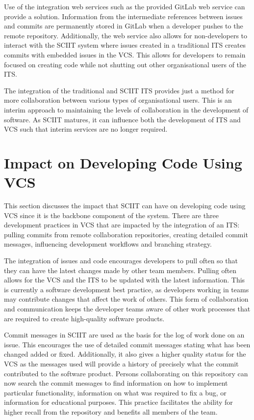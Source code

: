 \documentclass{mproj}
\begin{document}
Use of the integration web services such as the provided GitLab web service can provide a solution. Information from the intermediate references between issues and commits are permanently stored in GitLab when a developer pushes to the remote repository. Additionally, the web service also allows for non-developers to interact with the SCIIT system where issues created in a traditional ITS creates commits with embedded issues in the VCS. This allows for developers to remain focused on creating code while not shutting out other organisational users of the ITS.

The integration of the traditional and SCIIT ITS provides just a method for more collaboration between various types of organisational users. This is an interim approach to maintaining the levels of collaboration in the development of software. As SCIIT matures, it can influence both the development of ITS and VCS such that interim services are no longer required.

\section{Impact on Developing Code Using VCS}

This section discusses the impact that SCIIT can have on developing code using VCS since it is the backbone component of the system. There are three development practices in VCS that are impacted by the integration of an ITS: pulling commits from remote collaboration repositories, creating detailed commit messages, influencing development workflows and branching strategy.

The integration of issues and code encourages developers to pull often so that they can have the latest changes made by other team members. Pulling often allows for the VCS and the ITS to be updated with the latest information. This is currently a software development best practice, as developers working in teams may contribute changes that affect the work of others. This form of collaboration and communication keeps the developer teams aware of other work processes that are required to create high-quality software products.

Commit messages in SCIIT are used as the basis for the log of work done on an issue. This encourages the use of detailed commit messages stating what has been changed added or fixed. Additionally, it also gives a higher quality status for the VCS as the messages used will provide a history of precisely what the commit contributed to the software product. Persons collaborating on this repository can now search the commit messages to find information on how to implement particular functionality, information on what was required to fix a bug, or information for educational purposes. This practice facilitates the ability for higher recall from the repository and benefits all members of the team.
\end{document}
